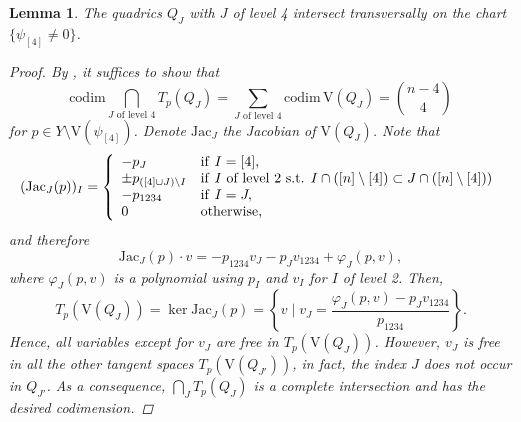 \documentclass[11pt,reqno]{amsart}
\newtheorem{lemma}[theorem]{Lemma}
\theoremstyle{definition}
\numberwithin{theorem}{section}
\newcommand{\codim}{\mathrm{codim}}
\newcommand{\Jac}{\mathrm{Jac}}
\numberwithin{equation}{section}
\begin{document}
\begin{lemma}\label{lemma:transint}
The quadrics $Q_J$ with $J$ of level 4  intersect transversally on the chart $\{\psi_{[4]} \neq 0\}$.
\begin{proof}
By \cite[Section 2.2.1]{shafarevich2013basic}, it suffices to show that
\begin{equation*}
\codim \bigcap\limits_{J \text{ of level 4}} T_p(Q_J) 
= \sum\limits_{J \text{ of level 4}} \codim \, \textrm{V}(Q_J) = {{n-4}\choose 4}
\end{equation*}
for $p \in Y\setminus \textrm{V}(\psi_{[4]} )$.
Denote $\Jac_J$ the Jacobian of $\textrm{V}(Q_J)$. Note that 
\begin{equation*}
(\Jac_J(p))_I = \left\{ 
\begin{array}{ll}
    -p_J & {\rm if}~I=[4], \\
     \pm p_{([4] \cup J) \setminus I} & {\rm if}~I \textrm{ of level 2 s.t. } I \cap ([n] \setminus [4]) \subset J \cap ([n] \setminus [4]))\\
     -p_{1234} & {\rm if}~I = J, \\
     0 & \textrm{otherwise,}
\end{array}
\right.
\end{equation*}
and therefore
\begin{equation*}
\Jac_J(p) \cdot v
=
-p_{1234} v_J - p_J v_{1234} + \varphi_J(p,v),
\end{equation*}
where $\varphi_J(p,v)$ is a polynomial using $p_I$ and $v_I$ for $I$ of level 2. Then, 
\begin{equation*}
T_p(\textrm{V}(Q_J))  = \ker \Jac_J(p) = \left\{ v \mid v_{J} = \frac{\varphi_J(p,v)- p_J v_{1234}}{p_{1234}} \right\}.
\end{equation*}
Hence, all variables except for $v_J$ are free in $T_p(\textrm{V}(Q_J))$. However, $v_J$ is free in all the other tangent spaces $T_p(\textrm{V}(Q_{J'}))$, in fact, the index $J$ does not occur in $Q_{J'}$. As a consequence, $\bigcap_{J} T_p(Q_J) $ is a complete intersection and has the desired codimension.
\end{proof}
\end{lemma}
\end{document}
